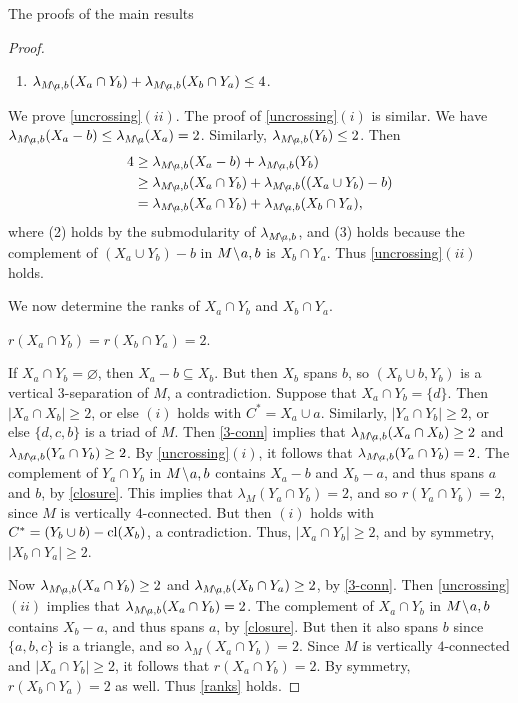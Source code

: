 \documentclass[12pt]{amsart}
\begin{document}
\begin{section}{The proofs of the main results}
\begin{proof}
\begin{claim}
\begin{enumerate}[$(i)$]
\item $\lambda_{M \!\setminus\! a,b}(X_a \cap Y_b) + \lambda_{M \!\setminus\! a,b}(X_b \cap Y_a) \le 4$.
\end{enumerate}
\end{claim}
We prove \ref{uncrossing}$(ii)$.
The proof of \ref{uncrossing}$(i)$ is similar.
We have $\lambda_{M \!\setminus\! a,b}(X_a - b) \le \lambda_{M \!\setminus\! a}(X_a) = 2$. 
Similarly, $\lambda_{M \!\setminus\! a,b}(Y_b) \le 2$.
Then 
\begin{align}
4 &\ge \lambda_{M \del a,b}(X_a - b) + \lambda_{M \del a,b}(Y_b) \\
&\ge \lambda_{M \del a,b}(X_a \cap Y_b) + \lambda_{M \del a,b}((X_a \cup Y_b) - b) \\
&= \lambda_{M \del a,b}(X_a \cap Y_b) + \lambda_{M \del a,b}(X_b \cap Y_a),
\end{align}
where (2) holds by the submodularity of $\lambda_{M \!\setminus\! a,b}$, and (3) holds because the complement of $(X_a \cup Y_b) - b$ in $M \!\setminus\! a,b$ is $X_b \cap Y_a$.
Thus \ref{uncrossing}$(ii)$ holds.


We now determine the ranks of $X_a \cap Y_b$ and $X_b \cap Y_a$.


\begin{claim} \label{ranks}
$r(X_a \cap Y_b) = r(X_b \cap Y_a) = 2$.
\end{claim}
If $X_a \cap Y_b = \varnothing$, then $X_a - b \subseteq X_b$. 
But then $X_b$ spans $b$, so $(X_b \cup b, Y_b)$ is a vertical $3$-separation of $M$, a contradiction.
Suppose that $X_a \cap Y_b = \{d\}$.
Then $|X_a \cap X_b| \ge 2$, or else $(i)$ holds with $C^* = X_a \cup a$.
Similarly, $|Y_a \cap Y_b| \ge 2$, or else $\{d ,c, b\}$ is a triad of $M$.
Then \ref{3-conn} implies that $\lambda_{M \!\setminus\! a,b}(X_a \cap X_b) \ge 2$ and $\lambda_{M \!\setminus\! a,b}(Y_a \cap Y_b) \ge 2$.
By \ref{uncrossing}$(i)$, it follows that $\lambda_{M \!\setminus\! a,b}(Y_a \cap Y_b) = 2$.
The complement of $Y_a \cap Y_b$ in $M \!\setminus\! a,b$ contains $X_a - b$ and $X_b - a$, and thus spans $a$ and $b$, by \ref{closure}.
This implies that $\lambda_M(Y_a \cap Y_b) = 2$, and so $r(Y_a \cap Y_b) = 2$, since $M$ is vertically $4$-connected.
But then $(i)$ holds with $C^* = (Y_b \cup b) - \operatorname{cl}(X_b)$, a contradiction.
Thus, $|X_a \cap Y_b| \ge 2$, and by symmetry, $|X_b \cap Y_a| \ge 2$.

Now $\lambda_{M \!\setminus\! a,b}(X_a \cap Y_b) \ge 2$ and $\lambda_{M \!\setminus\! a,b}(X_b \cap Y_a) \ge 2$, by \ref{3-conn}.
Then \ref{uncrossing}$(ii)$ implies that $\lambda_{M \!\setminus\! a,b}(X_a \cap Y_b) = 2$.
The complement of $X_a \cap Y_b$ in $M \!\setminus\! a,b$ contains $X_b - a$, and thus spans $a$, by \ref{closure}.
But then it also spans $b$ since $\{a, b, c\}$ is a triangle, and so $\lambda_{M}(X_a \cap Y_b) = 2$.
Since $M$ is vertically $4$-connected and $|X_a \cap Y_b| \ge 2$, it follows that $r(X_a \cap Y_b) = 2$.
By symmetry, $r(X_b \cap Y_a) = 2$ as well.
Thus \ref{ranks} holds.



\end{proof}
\end{section}
\end{document}
